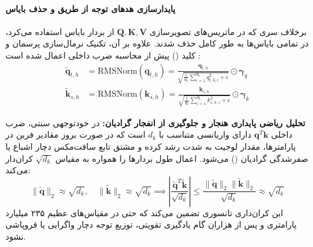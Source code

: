 \paragraph*{پایدارسازی هدهای توجه از طریق  و حذف بایاس}
برخلاف سری  که در ماتریس‌های تصویرسازی $\mathbf{Q}, \mathbf{K}, \mathbf{V}$ از بردار بایاس استفاده می‌کرد، در  تمامی بایاس‌ها به طور کامل حذف شدند. علاوه بر آن، تکنیک نرمال‌سازی پرسمان و کلید () پیش از محاسبه ضرب داخلی اعمال شده است \cite{qwen2025qwen3}:
\begin{align}
    \tilde{\mathbf{q}}_{t,h} &= \text{RMSNorm}(\mathbf{q}_{t,h}) = \frac{\mathbf{q}_{t,h}}{\sqrt{\frac{1}{d_k} \sum_{i=1}^{d_k} q_{t,h,i}^2 + \epsilon}} \odot \boldsymbol{\gamma}_q \\
    \tilde{\mathbf{k}}_{s,h} &= \text{RMSNorm}(\mathbf{k}_{s,h}) = \frac{\mathbf{k}_{s,h}}{\sqrt{\frac{1}{d_k} \sum_{i=1}^{d_k} k_{s,h,i}^2 + \epsilon}} \odot \boldsymbol{\gamma}_k
\end{align}

\textbf{تحلیل ریاضی پایداری هنجار و جلوگیری از انفجار گرادیان:}
در خود‌توجهی سنتی، ضرب داخلی $\mathbf{q}^T \mathbf{k}$ دارای واریانسی متناسب با $d_k$ است که در صورت بروز مقادیر فرین در پارامترها، مقدار لوجیت به شدت رشد کرده و مشتق تابع سافت‌مکس دچار اشباع یا صفرشدگی گرادیان () می‌شود. اعمال  طول بردارها را همواره به مقیاس $\sqrt{d_k}$ کران‌دار می‌کند:
\begin{equation}
    \|\tilde{\mathbf{q}}\|_2 \approx \sqrt{d_k}, \quad \|\tilde{\mathbf{k}}\|_2 \approx \sqrt{d_k} \implies \left| \frac{\tilde{\mathbf{q}}^T \tilde{\mathbf{k}}}{\sqrt{d_k}} \right| \le \frac{\|\tilde{\mathbf{q}}\|_2 \|\tilde{\mathbf{k}}\|_2}{\sqrt{d_k}} \approx \sqrt{d_k}
\end{equation}
این کران‌داری تانسوری تضمین می‌کند که حتی در مقیاس‌های عظیم ۲۳۵ میلیارد پارامتری و پس از هزاران گام یادگیری تقویتی، توزیع توجه دچار واگرایی یا فروپاشی نشود.

